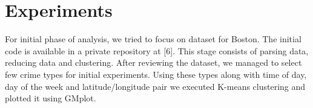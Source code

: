 \documentclass[journal, a4paper]{IEEEtran}
\begin{document}
\section{Experiments}
    For initial phase of analysis, we tried to focus on dataset for Boston. The initial code is available in a private repository at [6]. This stage consists of parsing data, reducing data and clustering. After reviewing the dataset, we managed to select few crime types for initial experiments. Using these types along with time of day, day of the week and latitude/longitude pair we executed K-means clustering and plotted it using GMplot.  



\end{document}
